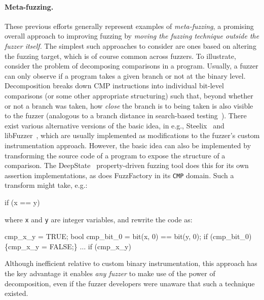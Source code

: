 \paragraph{Meta-fuzzing.}
These previous efforts generally represent examples of 
\emph{meta-fuzzing}, a promising overall approach to improving fuzzing by 
\emph{moving the fuzzing technique outside the fuzzer itself.}  The simplest 
such approaches to consider are ones based on altering the fuzzing target, 
which is of course common across fuzzers. To illustrate, consider
the problem of decomposing comparisons in a program.  Usually, a fuzzer can only observe if a 
program takes a given branch or not at the binary level.  Decomposition breaks 
down CMP instructions into individual bit-level comparisons (or some other 
appropriate structuring) such that, beyond whether or not a branch was taken,
how \emph{close} the branch is to being taken is also visible to the fuzzer  (analogous to a branch 
distance in search-based testing~\cite{mcminn2004search}).  There exist various alternative versions of 
the basic idea, in e.g., Steelix~\cite{Steelix} and
libFuzzer~\cite{libFuzzer}, which are usually implemented 
as modifications to the fuzzer's custom instrumentation approach.  However, the basic 
idea can also be implemented by transforming the source code of a program to 
expose the structure of a comparison.  The DeepState~\cite{DeepState} property-driven fuzzing 
tool does this for its own assertion implementations, as does FuzzFactory in 
its \texttt{CMP} domain.  Such a transform might take, e.g.:

\begin{code}

if (x == y)
\end{code}

\noindent where {\tt x} and {\tt y} are integer variables, and rewrite the code 
as:

{\scriptsize
\begin{code}
cmp\_x\_y = TRUE;
bool cmp\_bit\_0 = bit(x, 0) == bit(y, 0);
if (cmp\_bit\_0) \{cmp\_x\_y = FALSE;\}
$\ldots$
if (cmp\_x\_y)
\end{code}
}

\noindent Although inefficient relative to custom binary instrumentation, this
approach has the key advantage it enables \emph{any fuzzer} to make use of the power of 
decomposition, even if the fuzzer developers were unaware that such a technique 
existed. 

